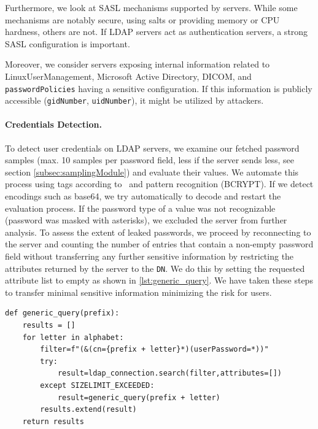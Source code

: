Furthermore, we look at \gls{SASL} mechanisms supported by servers. While some mechanisms are notably secure, \eg using salts or providing memory or CPU hardness, others are not. If LDAP servers act as authentication servers, a strong \gls{SASL} configuration is important.

Moreover, we consider servers exposing internal information related to LinuxUserManagement, Microsoft Active Directory, DICOM, and \texttt{passwordPolicies} having a sensitive configuration. If this information is publicly accessible (\eg \texttt{gidNumber}, \texttt{uidNumber}), it might be utilized by attackers.

\paragraph{Credentials Detection.}

To detect user credentials on LDAP servers, we examine our fetched password samples (max. 10 samples per password field, less if the server sends less, see section \ref{subsec:samplingModule}) and evaluate their values. We automate this process using tags according to~\cite{OpenLDAPSoftwareAdministrator} and pattern recognition (\eg BCRYPT). If we detect encodings such as base64, we try automatically to decode and restart the evaluation process. If the password type of a value was not recognizable (\eg password was masked with asterisks), we excluded the server from further analysis. To assess the extent of leaked passwords, we proceed by reconnecting to the server and counting the number of entries that contain a non-empty password field without transferring any further sensitive information by restricting the attributes returned by the server to the \texttt{DN}. We do this by setting the requested attribute list to empty as shown in \cref{lst:generic_query}.
We have taken these steps to transfer minimal sensitive information minimizing the risk for users.

\begin{lstfloat}[bt]
\setlength{\belowcaptionskip}{-1em}
\begin{lstlisting}[basicstyle=\ttfamily\footnotesize, frame=single]
def generic_query(prefix):
    results = []
    for letter in alphabet:
        filter=f"(&(cn={prefix + letter}*)(userPassword=*))"
        try:
            result=ldap_connection.search(filter,attributes=[])
        except SIZELIMIT_EXCEEDED:
            result=generic_query(prefix + letter)
        results.extend(result)
    return results
\end{lstlisting}
\caption{Prefix search to count LDAP entries.}
\label{lst:generic_query}
\end{lstfloat}

